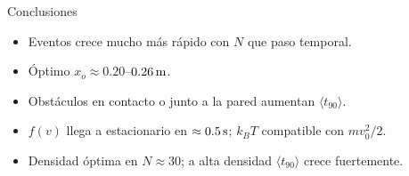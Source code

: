 \begin{frame}{Conclusiones}
  \begin{itemize}\setlength{\itemsep}{14pt}
    \item Eventos crece mucho más rápido con $N$ que paso temporal.
    \item Óptimo $x_o \approx 0.20$--$0.26\,\mathrm{m}$.
    \item Obstáculos en contacto o junto a la pared aumentan $\langle t_{90}\rangle$.
    \item $f(v)$ llega a estacionario en $\approx 0.5\,\mathrm{s}$; $k_B T$ compatible con $m v_0^2/2$.
    \item Densidad óptima en $N \approx 30$; a alta densidad $\langle t_{90}\rangle$ crece fuertemente.
  \end{itemize}
\end{frame}
